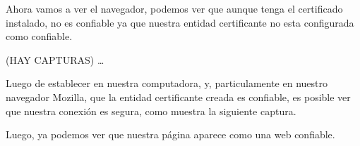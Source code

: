 \noindent Ahora vamos a ver el navegador, podemos ver que aunque tenga el certificado instalado, no es confiable 
ya que nuestra entidad certificante no esta configurada como confiable.

 (HAY CAPTURAS)
…

Luego de establecer en nuestra computadora, y, particulamente en nuestro navegador Mozilla, que la 
entidad certificante creada es confiable, es posible ver que nuestra conexión es segura, como muestra 
la siguiente captura.

\noindent Luego, ya podemos ver que nuestra página aparece como una web confiable.




